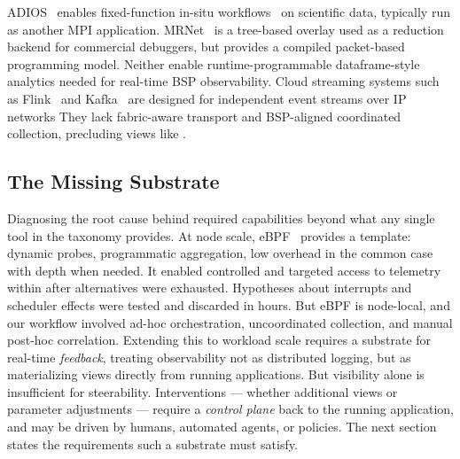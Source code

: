 ADIOS~\cite{Godoy2020:ADIOS2} enables fixed-function in-situ workflows~\cite{Eisen2025:ADIOS} on
scientific data, typically run as another MPI application.
MRNet~\cite{Roth2003:MRNet,Willi2016:MRNetApps} is a tree-based overlay used as a reduction backend
for commercial debuggers, but provides a compiled packet-based programming model.
Neither enable runtime-programmable dataframe-style analytics needed for real-time BSP
observability.
Cloud streaming systems such as Flink~\cite{Carbo2015:ApacheFlink} and Kafka~\cite{Kreps2011:Kafka}
are designed for independent event streams over IP networks They lack fabric-aware transport and
BSP-aligned coordinated collection, precluding views like .

\subsection{The Missing Substrate}\label{sec:orca:bg:missing}

Diagnosing the root cause behind  required capabilities beyond what any
single tool in the taxonomy provides.
At node scale, eBPF~\cite{:eBPF} provides a template: dynamic probes, programmatic aggregation, low
overhead in the common case with depth when needed.
It enabled controlled and targeted access to telemetry within \mpiw{} after alternatives were
exhausted.
Hypotheses about interrupts and scheduler effects were tested and discarded in hours.
But eBPF is node-local, and our workflow involved ad-hoc orchestration, uncoordinated collection,
and manual post-hoc correlation.
Extending this to workload scale requires a substrate for real-time \emph{feedback}, treating
observability not as distributed logging, but as materializing views directly from running
applications.
But visibility alone is insufficient for steerability. Interventions --- whether additional views
or parameter adjustments --- require a \emph{control plane} back to the running application,
and may be driven by humans, automated agents, or policies.
The next section states the requirements such a substrate must satisfy.
